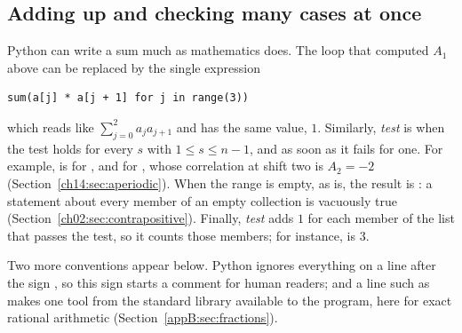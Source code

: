 \subsection*{Adding up and checking many cases at once}
Python can write a sum much as mathematics does. The loop that computed $A_1$ above can be replaced by the single expression
\par\noindent\begin{minipage}{\linewidth}
\begin{lstlisting}
sum(a[j] * a[j + 1] for j in range(3))
\end{lstlisting}
\end{minipage}\par
which reads like $\sum_{j=0}^{2}a_ja_{j+1}$ and has the same value, $1$. Similarly, \emph{test}  is  when the test holds for every $s$ with $1\le s\le n-1$, and  as soon as it fails for one. For example,  is  for , and  for , whose correlation at shift two is $A_2=-2$ (Section~\ref{ch14:sec:aperiodic}). When the range is empty, as  is, the result is : a statement about every member of an empty collection is vacuously true (Section~\ref{ch02:sec:contrapositive}). Finally, \emph{test}\code{)} adds $1$ for each member  of the list  that passes the test, so it counts those members; for instance,  is $3$.

Two more conventions appear below. Python ignores everything on a line after the sign \code{\#}, so this sign starts a comment for human readers; and a line such as  makes one tool from the standard library available to the program, here  for exact rational arithmetic (Section~\ref{appB:sec:fractions}).
